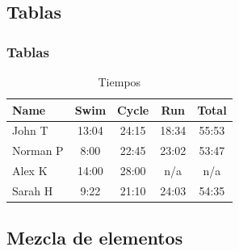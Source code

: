\documentclass[aspectratio=43]{beamer}
\begin{document}
\subsection{Tablas}

\begin{frame}
    \frametitle{Tablas}
    \begin{table}
        \begin{tabular}{l | c | c | c | c }
            Name & Swim & Cycle & Run & Total \\
            \hline \hline
            John T & 13:04 & 24:15 & 18:34 & 55:53 \\ 
            Norman P & 8:00 & 22:45 & 23:02 & 53:47\\
            Alex K & 14:00 & 28:00 & n/a & n/a\\
            Sarah H & 9:22 & 21:10 & 24:03 & 54:35 
        \end{tabular}
        \caption{Tiempos}
    \end{table}
\end{frame}

\subsection{Mezcla de elementos}
\end{document}
